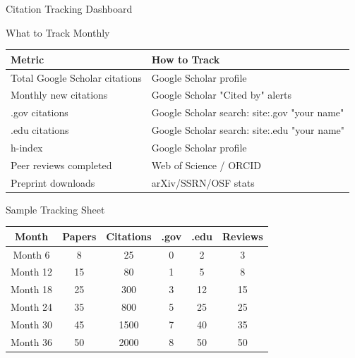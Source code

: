\documentclass[11pt]{beamer}
\begin{document}
\begin{frame}{Citation Tracking Dashboard}
	\scriptsize
	\begin{block}{What to Track Monthly}
		\centering
		\begin{tabular}{|p{4cm}|p{5.5cm}|}
			\hline
			\textbf{Metric} & \textbf{How to Track} \\
			\hline
			Total Google Scholar citations & Google Scholar profile \\
			\hline
			Monthly new citations & Google Scholar "Cited by" alerts \\
			\hline
			.gov citations & Google Scholar search: site:.gov "your name" \\
			\hline
			.edu citations & Google Scholar search: site:.edu "your name" \\
			\hline
			h-index & Google Scholar profile \\
			\hline
			Peer reviews completed & Web of Science / ORCID \\
			\hline
			Preprint downloads & arXiv/SSRN/OSF stats \\
			\hline
		\end{tabular}
	\end{block}
	\begin{block}{Sample Tracking Sheet}
		\centering
		\begin{tabular}{|c|c|c|c|c|c|}
			\hline
			\textbf{Month} & \textbf{Papers} & \textbf{Citations} & \textbf{.gov} & \textbf{.edu} & \textbf{Reviews} \\
			\hline
			Month 6 & 8 & 25 & 0 & 2 & 3 \\
			\hline
			Month 12 & 15 & 80 & 1 & 5 & 8 \\
			\hline
			Month 18 & 25 & 300 & 3 & 12 & 15 \\
			\hline
			Month 24 & 35 & 800 & 5 & 25 & 25 \\
			\hline
			Month 30 & 45 & 1500 & 7 & 40 & 35 \\
			\hline
			Month 36 & 50 & 2000 & 8 & 50 & 50 \\
			\hline
		\end{tabular}
	\end{block}
\end{frame}
	
\end{document}
